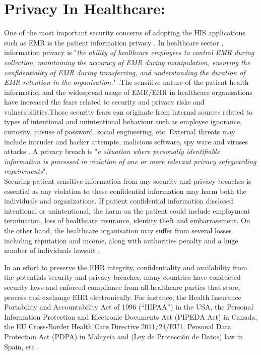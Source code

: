 \section{Privacy In Healthcare:}
One of the most important security concerns of adopting the HIS applications such as EMR is the patient information privacy \cite{Mahfuth2016}. In healthcare sector , information privacy is "\textit{the ability of healthcare employees to control EMR during collection, maintaining the accuracy of EMR during manipulation, ensuring the confidentiality of EMR during transferring, and understanding the duration of EMR retention in the organisation.}" \cite{Rahim2016}.The sensitive nature of the patient health information and the widespread usage of EMR/EHR in healthcare organisations have increased the fears related to security and privacy risks and vulnerabilities.Those security fears can originate from internal sources related to types of intentional and unintentional behaviour such as employee ignorance, curiosity, misuse of password, social engineering, etc. External threats may include intruder and hacker attempts, malicious software, spy ware and viruses attacks  \cite{Samy2010b}. A privacy breach is "\textit{a situation where personally identifiable information is processed in violation of one or more relevant privacy safeguarding requirements}"\cite{ISO/IEC}.\\Securing patient sensitive information from any security and privacy breaches is essential as any violation to these confidential information may harm both the individuals and organizations. If patient confidential information disclosed intentional or unintentional, the harm on the patient could include employment termination, loss of healthcare insurance, identity theft and embarrassment. On the other hand, the healthcare organisation may suffer from several losses including reputation and income, along with authorities penalty and a huge number of individuals lawsuit \cite{Wartenberg2010,Culnan2016}. 

In an effort to preserve the EHR integrity, confidentiality and availability from the potentials security and privacy breaches, many countries have conducted security laws and enforced compliance from all healthcare parties that store, process and exchange EHR electronically\cite{Hsu,Samy2010,Rahim2016}. For instance, the Health Insurance Portability and Accountability Act of 1996 (“HIPAA”) in the USA, the Personal Information Protection and Electronic Documents Act (PIPEDA  Act) in Canada, the EU Cross-Border Health Care Directive 2011/24/EU1, Personal Data Protection Act (PDPA) in Malaysia and (Ley de Protección de Datos) law in Spain, etc \cite{Bensefia2014,U.S.DepartmentofHealthandHumanServices}. 


